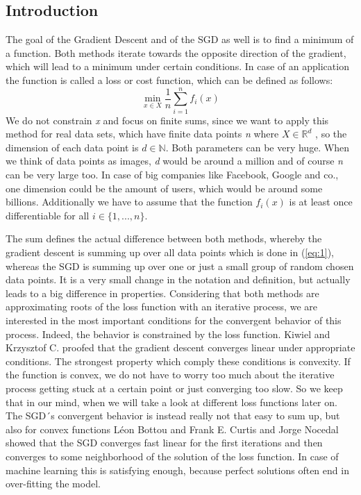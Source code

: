 \documentclass{article}
\begin{document}
\subsection{Introduction}
The goal of the Gradient Descent and of the SGD as well is to find a minimum of a function. Both methods iterate towards the opposite direction of the gradient, which will lead to a minimum under certain conditions. In case of an application the function is called a loss or cost function, which can be defined as follows: 
\begin{equation}
\label{eq:1}
\min_{x\in{X}}\frac{1}{n}\sum^{n}_{i=1}{f_i(x)} 
\end{equation}
We do not constrain \textit{x} and focus on finite sums, since we want to apply this method for real data sets, which have finite data points \textit{n} where $ X \in \mathbb{R}^d $ , so the dimension of each data point is $ d \in \mathbb{N}$.  Both parameters can be very huge. When we think of data points as images, \textit{d} would be around a million and of course \textit{n} can be very large too. In case of big companies like Facebook, Google and co., one dimension could be the amount of users, which would be around some billions. Additionally we have to assume that the function $ {f_i(x)} $ is at least once differentiable for all $i \in \{1,...,n\} $. 

The sum defines the actual difference between both methods, whereby the gradient descent is summing up over all data points which is done in (\ref{eq:1}), whereas the SGD is summing up over one or just a small group of random chosen data points. It is a very small change in the notation and definition, but actually leads to a big difference in properties. Considering that both methods are approximating roots of the loss function with an iterative process, we are interested in the most important conditions for the convergent behavior of this process. Indeed, the behavior is constrained by the loss function. Kiwiel and Krzysztof C.\cite{Kiwiel} proofed that the gradient descent converges linear under appropriate conditions. The strongest property which comply these conditions is convexity. If the function is convex, we do not have to worry too much about the iterative process getting stuck at a certain point or just converging too slow. So we keep that in our mind, when we will take a look at different loss functions later on. The SGD´s convergent behavior is instead really not that easy to sum up, but also for convex functions Léon Bottou and Frank E. Curtis and Jorge Nocedal \cite{bottou} showed that the SGD converges fast linear for the first iterations and then converges to some neighborhood of the solution of the loss function. In case of machine learning this is satisfying enough, because perfect solutions often end in over-fitting the model.
\pagebreak
\end{document}
